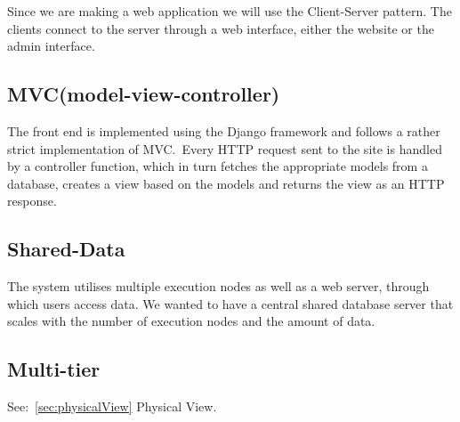 Since we are making a web application we will use the Client-Server
pattern. The clients connect to the server through a web interface,
either the website or the admin interface. 

\subsection{MVC(model-view-controller)}

The front end is implemented using the Django framework and follows a
rather strict implementation of MVC.\ Every HTTP request sent to the
site is handled by a controller function, which in turn fetches the
appropriate models from a database, creates a view based on the models
and returns the view as an HTTP response. 

\subsection{Shared-Data}

The system utilises multiple execution nodes as well as a web server,
through which users access data. We wanted to have a central shared
database server that scales with the number of execution nodes and the
amount of data. 

\subsection{Multi-tier}
See:~\ref{sec:physicalView} Physical View.


